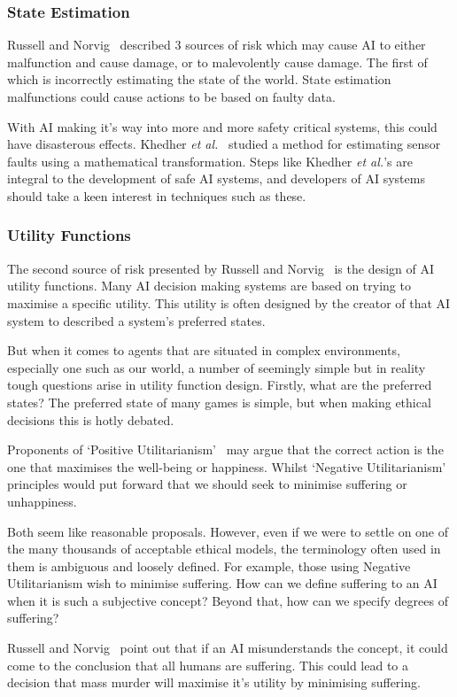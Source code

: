 \documentclass[]{final_report}
\begin{document}
\subsubsection{State Estimation}
Russell and Norvig~\cite{russell2016artificial} described 3 sources of risk which may cause AI to either malfunction and cause damage, or to malevolently cause damage. The first of which is incorrectly estimating the state of the world. State estimation malfunctions could cause actions to be based on faulty data.\par 
With AI making it's way into more and more safety critical systems, this could have disasterous effects. Khedher \textit{et al.}~\cite{khedher2009state} studied a method for estimating sensor faults using a mathematical transformation. Steps like Khedher \textit{et al.}'s are integral to the development of safe AI systems, and developers of AI systems should take a keen interest in techniques such as these.

\subsubsection{Utility Functions}
The second source of risk presented by Russell and Norvig~\cite{russell2016artificial} is the design of AI utility functions. Many AI decision making systems are based on trying to maximise a specific utility. This utility is often designed by the creator of that AI system to described a system's preferred states.\par 
But when it comes to agents that are situated in complex environments, especially one such as our world, a number of seemingly simple but in reality tough questions arise in utility function design. Firstly, what are the preferred states? The preferred state of many games is simple, but when making ethical decisions this is hotly debated.\par 
Proponents of `Positive Utilitarianism'~\cite{mill1987utilitarianism} may argue that the correct action is the one that maximises the well-being or happiness. Whilst `Negative Utilitarianism'~\cite{popper1971open} principles would put forward that we should seek to minimise suffering or unhappiness.\par 
Both seem like reasonable proposals. However, even if we were to settle on one of the many thousands of acceptable ethical models, the terminology often used in them is ambiguous and loosely defined. For example, those using Negative Utilitarianism wish to minimise suffering. How can we define suffering to an AI when it is such a subjective concept? Beyond that, how can we specify degrees of suffering?\par 
Russell and Norvig~\cite{russell2016artificial} point out that if an AI misunderstands the concept, it could come to the conclusion that all humans are suffering. This could lead to a decision that mass murder will maximise it's utility by minimising suffering. 
\end{document}
